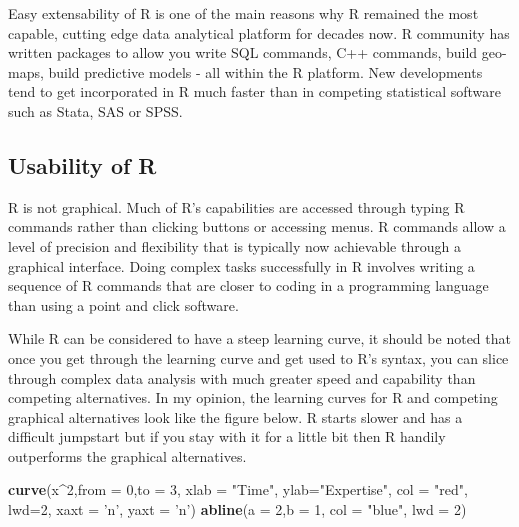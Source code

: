 \documentclass[]{krantz}
\makeatletter
\newenvironment{Shaded}{\begin{snugshade}}{\end{snugshade}}
\newcommand{\KeywordTok}[1]{\textcolor[rgb]{0.27,0.27,0.27}{\textbf{#1}}}
\newcommand{\DataTypeTok}[1]{\textcolor[rgb]{0.27,0.27,0.27}{#1}}
\newcommand{\DecValTok}[1]{\textcolor[rgb]{0.06,0.06,0.06}{#1}}
\newcommand{\StringTok}[1]{\textcolor[rgb]{0.5,0.5,0.5}{#1}}
\newcommand{\OperatorTok}[1]{\textcolor[rgb]{0.81,0.36,0.00}{\textbf{#1}}}
\newcommand{\NormalTok}[1]{#1}
\newenvironment{kframe}{%
\medskip{}
\setlength{\fboxsep}{.8em}
 \def\at@end@of@kframe{}%
 \ifinner\ifhmode%
  \def\at@end@of@kframe{\end{minipage}}%
  \begin{minipage}{\columnwidth}%
 \fi\fi%
 \def\FrameCommand##1{\hskip\@totalleftmargin \hskip-\fboxsep
 \colorbox{shadecolor}{##1}\hskip-\fboxsep
     \hskip-\linewidth \hskip-\@totalleftmargin \hskip\columnwidth}%
 \MakeFramed {\advance\hsize-\width
   \@totalleftmargin\z@ \linewidth\hsize
   \@setminipage}}%
 {\par\unskip\endMakeFramed%
 \at@end@of@kframe}
\renewenvironment{Shaded}{\begin{kframe}}{\end{kframe}}
\theoremstyle{definition}
\theoremstyle{definition}
\theoremstyle{definition}
\theoremstyle{remark}
\makeatother
\begin{document}
Easy extensability of R is one of the main reasons why R remained the
most capable, cutting edge data analytical platform for decades now. R
community has written packages to allow you write SQL commands, C++
commands, build geo-maps, build predictive models - all within the R
platform. New developments tend to get incorporated in R much faster
than in competing statistical software such as Stata, SAS or SPSS.

\subsection{Usability of R}\label{usability-of-r}

R is not graphical. Much of R's capabilities are accessed through typing
R commands rather than clicking buttons or accessing menus. R commands
allow a level of precision and flexibility that is typically now
achievable through a graphical interface. Doing complex tasks
successfully in R involves writing a sequence of R commands that are
closer to coding in a programming language than using a point and click
software.

While R can be considered to have a steep learning curve, it should be
noted that once you get through the learning curve and get used to R's
syntax, you can slice through complex data analysis with much greater
speed and capability than competing alternatives. In my opinion, the
learning curves for R and competing graphical alternatives look like the
figure below. R starts slower and has a difficult jumpstart but if you
stay with it for a little bit then R handily outperforms the graphical
alternatives.

\begin{Shaded}
\begin{Highlighting}[]
\KeywordTok{curve}\NormalTok{(x}\OperatorTok{^}\DecValTok{2}\NormalTok{,}\DataTypeTok{from =} \DecValTok{0}\NormalTok{,}\DataTypeTok{to =} \DecValTok{3}\NormalTok{, }\DataTypeTok{xlab =} \StringTok{"Time"}\NormalTok{, }\DataTypeTok{ylab=}\StringTok{"Expertise"}\NormalTok{, }
      \DataTypeTok{col =} \StringTok{"red"}\NormalTok{, }\DataTypeTok{lwd=}\DecValTok{2}\NormalTok{, }\DataTypeTok{xaxt =} \StringTok{'n'}\NormalTok{, }\DataTypeTok{yaxt =} \StringTok{'n'}\NormalTok{)}
\KeywordTok{abline}\NormalTok{(}\DataTypeTok{a =} \DecValTok{2}\NormalTok{,}\DataTypeTok{b =} \DecValTok{1}\NormalTok{, }\DataTypeTok{col =} \StringTok{"blue"}\NormalTok{, }\DataTypeTok{lwd =} \DecValTok{2}\NormalTok{)}
\end{Highlighting}
\end{Shaded}
\end{document}
